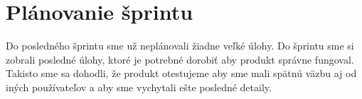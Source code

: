 \documentclass{article}
\begin{document}
    \section*{Plánovanie šprintu}
        \textnormal {Do posledného šprintu sme už neplánovali žiadne veľké úlohy. Do šprintu sme si zobrali posledné úlohy, ktoré je potrebné dorobiť aby produkt správne fungoval. Takisto sme sa dohodli, že produkt otestujeme aby sme mali spätnú väzbu aj od iných používateľov a aby sme vychytali ešte posledné detaily. }
\end{document}

